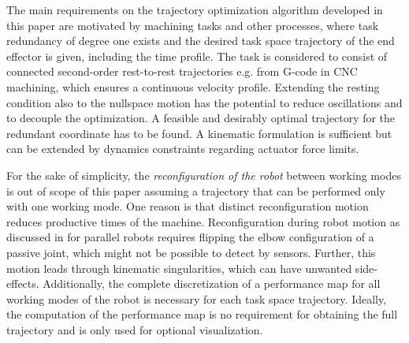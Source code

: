 \documentclass[runningheads]{llncs}
\begin{document}

The main requirements on the trajectory optimization algorithm developed in this paper are motivated by machining tasks and other processes, where task redundancy of degree one exists and the desired task space trajectory of the end effector is given, including the time profile.
The task is considered to consist of connected second-order rest-to-rest trajectories e.g. from G-code in CNC machining, which ensures a continuous velocity profile.
Extending the resting condition also to the nullspace motion has the potential to reduce oscillations and to decouple the optimization.
A feasible and desirably optimal trajectory for the redundant coordinate has to be found.
A kinematic formulation is sufficient but can be extended by dynamics constraints regarding actuator force limits.



For the sake of simplicity, the \emph{reconfiguration of the robot} between working modes is out of scope of this paper assuming a trajectory that can be performed only with one working mode.
One reason is that distinct reconfiguration motion \cite{KotlarskiDoHeiOrt2010} reduces productive times of the machine.
Reconfiguration during robot motion as discussed in \cite{RevelesWenoth2016} for parallel robots requires flipping the elbow configuration of a passive joint, which might not be possible to detect by sensors. 
Further, this motion leads through kinematic singularities, which can have unwanted side-effects.
Additionally, the complete discretization of a performance map for all working modes of the robot is necessary for each task space trajectory.
Ideally, the computation of the performance map is no requirement for obtaining the full trajectory and is only used for optional visualization.
\end{document}
